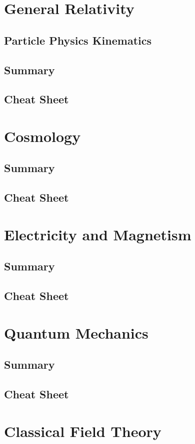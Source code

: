 \documentclass[12pt]{book}
\begin{document}
\chapter{General Relativity}
\section{Particle Physics Kinematics}
\section{Summary}
\section{Cheat Sheet}

\chapter{Cosmology}
\section{Summary}
\section{Cheat Sheet}

\chapter{Electricity and Magnetism}
\section{Summary}
\section{Cheat Sheet}

\chapter{Quantum Mechanics}
\section{Summary}
\section{Cheat Sheet}

\chapter{Classical Field Theory}
\end{document}
